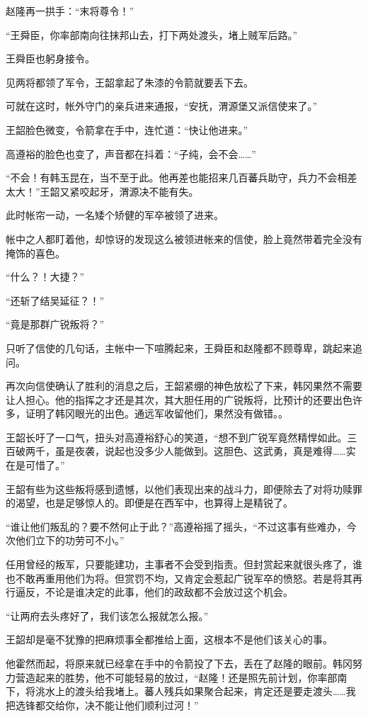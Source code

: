 赵隆再一拱手：“末将尊令！”

“王舜臣，你率部南向往抹邦山去，打下两处渡头，堵上贼军后路。”

王舜臣也躬身接令。

见两将都领了军令，王韶拿起了朱漆的令箭就要丢下去。

可就在这时，帐外守门的亲兵进来通报，“安抚，渭源堡又派信使来了。”

王韶脸色微变，令箭拿在手中，连忙道：“快让他进来。”

高遵裕的脸色也变了，声音都在抖着：“子纯，会不会……”

“不会！有韩玉昆在，当不至于此。他再差也能招来几百蕃兵助守，兵力不会相差太大！”王韶又紧咬起牙，渭源决不能有失。

此时帐帘一动，一名矮个矫健的军卒被领了进来。

帐中之人都盯着他，却惊讶的发现这么被领进帐来的信使，脸上竟然带着完全没有掩饰的喜色。

“什么？！大捷？”

“还斩了结吴延征？！”

“竟是那群广锐叛将？”

只听了信使的几句话，主帐中一下喧腾起来，王舜臣和赵隆都不顾尊卑，跳起来追问。

再次向信使确认了胜利的消息之后，王韶紧绷的神色放松了下来，韩冈果然不需要让人担心。他的指挥之才还是其次，其大胆任用的广锐叛将，比预计的还要出色许多，证明了韩冈眼光的出色。通远军收留他们，果然没有做错。。

王韶长吁了一口气，扭头对高遵裕舒心的笑道，“想不到广锐军竟然精悍如此。三百破两千，虽是夜袭，说起也没多少人能做到。这胆色、这武勇，真是难得……实在是可惜了。”

王韶有些为这些叛将感到遗憾，以他们表现出来的战斗力，即便除去了对将功赎罪的渴望，也是足够惊人的。即便是在西军中，也算得上是精锐了。

“谁让他们叛乱的？要不然何止于此？”高遵裕摇了摇头，“不过这事有些难办，今次他们立下的功劳可不小。”

任用曾经的叛军，只要能建功，主事者不会受到指责。但封赏起来就很头疼了，谁也不敢再重用他们为将。但赏罚不均，又肯定会惹起广锐军卒的愤怒。若是将其再行逼反，不论是谁决定的此事，他们的政敌都不会放过这个机会。

“让两府去头疼好了，我们该怎么报就怎么报。”

王韶却是毫不犹豫的把麻烦事全都推给上面，这根本不是他们该关心的事。

他霍然而起，将原来就已经拿在手中的令箭投了下去，丢在了赵隆的眼前。韩冈努力营造起来的胜势，他不可能轻易的放过，“赵隆！还是照先前计划，你率部南下，将洮水上的渡头给我堵上。蕃人残兵如果聚合起来，肯定还是要走渡头……我把选锋都交给你，决不能让他们顺利过河！”

